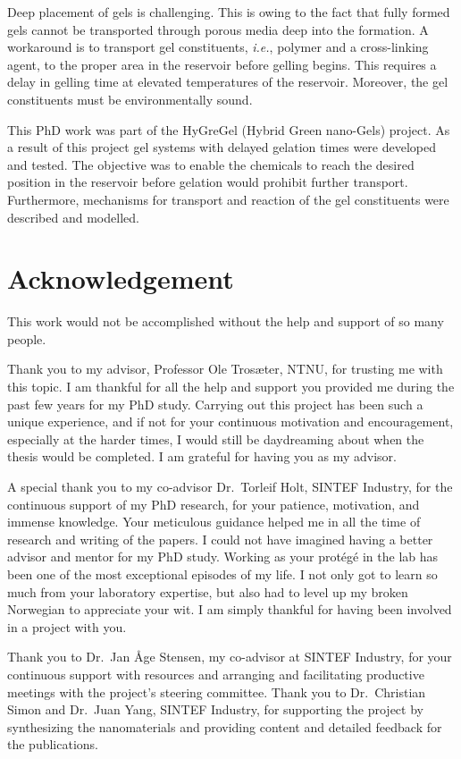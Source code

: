 Deep placement of gels is challenging. This is owing to the fact that fully formed gels cannot be transported through porous media deep into the formation. A workaround is to transport gel constituents, \textit{i.e.}, polymer and a cross-linking agent, to the proper area in the reservoir before gelling begins. This requires a delay in gelling time at elevated temperatures of the reservoir. Moreover, the gel constituents must be environmentally sound.

This PhD work was part of the HyGreGel (Hybrid Green nano-Gels) project. As a result of this project gel systems with delayed gelation times were developed and tested. The objective was to enable the chemicals to reach the desired position in the reservoir before gelation would prohibit further transport. Furthermore, mechanisms for transport and reaction of the gel constituents were described and modelled. 

 
\clearpage{\thispagestyle{empty}\cleardoublepage}
\chapter*{Acknowledgement}

This work would not be accomplished without the help and support of so many people.

Thank you to my advisor, Professor Ole Trosæter, NTNU, for trusting me with this topic. I am thankful for all the help and support you provided me during the past few years for my PhD study. Carrying out this project has been such a unique experience, and if not for your continuous motivation and encouragement, especially at the harder times, I would still be daydreaming about when the thesis would be completed. I am grateful for having you as my advisor.   

A special thank you to my co-advisor Dr.\ Torleif Holt, SINTEF Industry, for the continuous support of my PhD research, for your patience, motivation, and immense knowledge. Your meticulous guidance helped me in all the time of research and writing of the papers. I could not have imagined having a better advisor and mentor for my PhD study. Working as your protégé in the lab has been one of the most exceptional episodes of my life. I not only got to learn so much from your laboratory expertise, but also had to level up my broken Norwegian to appreciate your wit. I am simply thankful for having been involved in a project with you. 

Thank you to Dr.\ Jan Åge Stensen, my co-advisor at SINTEF Industry, for your continuous support with resources and arranging and facilitating productive meetings with the project's steering committee. Thank you to Dr.\ Christian Simon and Dr.\ Juan Yang, SINTEF Industry, for supporting the project by synthesizing the nanomaterials and providing content and detailed feedback for the publications.

